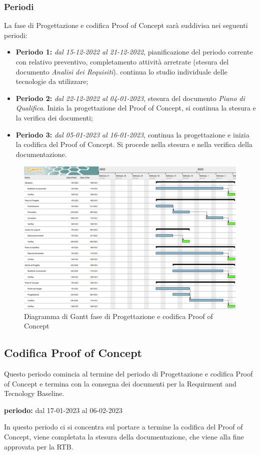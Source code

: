 \subsubsection{Periodi}
La fase di Progettazione e codifica Proof of Concept sarà suddivisa nei seguenti periodi:
\begin{itemize}
\item \textbf{Periodo 1:} \textit{dal 15-12-2022 al 21-12-2022}, pianificazione del periodo corrente con relativo preventivo, completamento attività arretrate 
(stesura del documento \textit{Analisi dei Requisiti}). continua lo studio individuale delle tecnologie da utilizzare;
\item \textbf{Periodo 2:} \textit{dal 22-12-2022 al 04-01-2023},  stesura del documento \textit{Piano di Qualifica}. Inizia la progettazione del Proof of Concept, si continua la stesura e la verifica dei documenti;
\item \textbf{Periodo 3:} \textit{dal 05-01-2023 al 16-01-2023}, continua la progettazione e inizia la codifica del Proof of Concept. Si procede nella stesura e nella verifica della documentazione.
\end{itemize}

\begin{figure}[H]
    \centering
    \includegraphics[scale=0.75]{image/gantt_poc.png}
    \caption{Diagramma di Gantt fase di Progettazione e codifica Proof of Concept}
\end{figure}
\pagebreak

\subsection{Codifica Proof of Concept}
Questo periodo comincia al termine del periodo di Progettazione e codifica Proof of Concept e termina con 
la consegna dei documenti per la Requirment and Tecnology Baseline.\\
\begin{center}
\textbf{periodo:} dal 17-01-2023 al 06-02-2023\\
\end{center}
In questo periodo ci si concentra sul portare a termine la codifica del Proof of Concept, viene completata la stesura della documentazione, che 
viene alla fine approvata per la RTB. 

